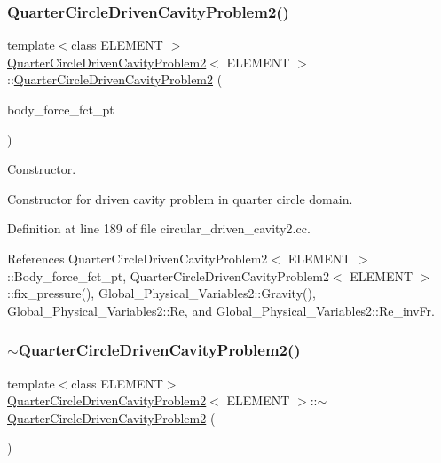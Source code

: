 \subsubsection{\texorpdfstring{Quarter\+Circle\+Driven\+Cavity\+Problem2()}{QuarterCircleDrivenCavityProblem2()}}
{\footnotesize\ttfamily template$<$class E\+L\+E\+M\+E\+NT $>$ \\
\hyperlink{classQuarterCircleDrivenCavityProblem2}{Quarter\+Circle\+Driven\+Cavity\+Problem2}$<$ E\+L\+E\+M\+E\+NT $>$\+::\hyperlink{classQuarterCircleDrivenCavityProblem2}{Quarter\+Circle\+Driven\+Cavity\+Problem2} (\begin{DoxyParamCaption}\item[{Navier\+Stokes\+Equations$<$ 2 $>$\+::Navier\+Stokes\+Body\+Force\+Fct\+Pt}]{body\+\_\+force\+\_\+fct\+\_\+pt }\end{DoxyParamCaption})}



Constructor. 

Constructor for driven cavity problem in quarter circle domain. 

Definition at line 189 of file circular\+\_\+driven\+\_\+cavity2.\+cc.



References Quarter\+Circle\+Driven\+Cavity\+Problem2$<$ E\+L\+E\+M\+E\+N\+T $>$\+::\+Body\+\_\+force\+\_\+fct\+\_\+pt, Quarter\+Circle\+Driven\+Cavity\+Problem2$<$ E\+L\+E\+M\+E\+N\+T $>$\+::fix\+\_\+pressure(), Global\+\_\+\+Physical\+\_\+\+Variables2\+::\+Gravity(), Global\+\_\+\+Physical\+\_\+\+Variables2\+::\+Re, and Global\+\_\+\+Physical\+\_\+\+Variables2\+::\+Re\+\_\+inv\+Fr.

\mbox{\label{classQuarterCircleDrivenCavityProblem2_afaedf67201056ed5466b139d2bb58d61}} 
\subsubsection{\texorpdfstring{$\sim$\+Quarter\+Circle\+Driven\+Cavity\+Problem2()}{~QuarterCircleDrivenCavityProblem2()}}
{\footnotesize\ttfamily template$<$class E\+L\+E\+M\+E\+NT$>$ \\
\hyperlink{classQuarterCircleDrivenCavityProblem2}{Quarter\+Circle\+Driven\+Cavity\+Problem2}$<$ E\+L\+E\+M\+E\+NT $>$\+::$\sim$\hyperlink{classQuarterCircleDrivenCavityProblem2}{Quarter\+Circle\+Driven\+Cavity\+Problem2} (\begin{DoxyParamCaption}{ }\end{DoxyParamCaption})\hspace{0.3cm}{\ttfamily [inline]}}



